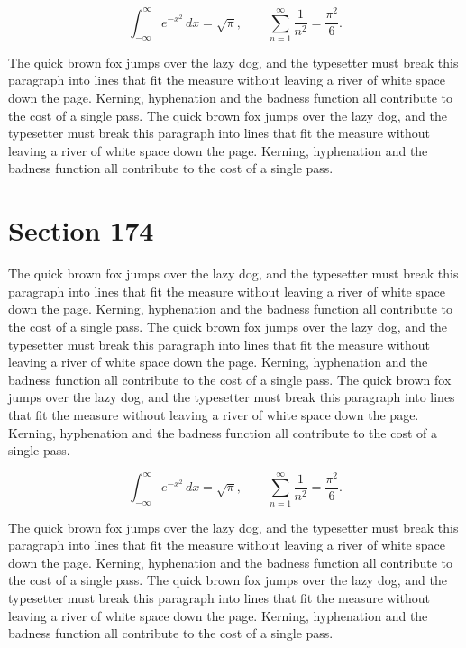 \documentclass{article}
\begin{document}
\begin{equation}
\int_{-\infty}^{\infty} e^{-x^{2}}\,dx = \sqrt{\pi}, \qquad
\sum_{n=1}^{\infty} \frac{1}{n^{2}} = \frac{\pi^{2}}{6}.
\end{equation}

The quick brown fox jumps over the lazy dog, and the typesetter must break this paragraph into lines that fit the measure without leaving a river of white space down the page. Kerning, hyphenation and the badness function all contribute to the cost of a single pass. The quick brown fox jumps over the lazy dog, and the typesetter must break this paragraph into lines that fit the measure without leaving a river of white space down the page. Kerning, hyphenation and the badness function all contribute to the cost of a single pass. 
\section{Section 174}
The quick brown fox jumps over the lazy dog, and the typesetter must break this paragraph into lines that fit the measure without leaving a river of white space down the page. Kerning, hyphenation and the badness function all contribute to the cost of a single pass. The quick brown fox jumps over the lazy dog, and the typesetter must break this paragraph into lines that fit the measure without leaving a river of white space down the page. Kerning, hyphenation and the badness function all contribute to the cost of a single pass. The quick brown fox jumps over the lazy dog, and the typesetter must break this paragraph into lines that fit the measure without leaving a river of white space down the page. Kerning, hyphenation and the badness function all contribute to the cost of a single pass. 

\begin{equation}
\int_{-\infty}^{\infty} e^{-x^{2}}\,dx = \sqrt{\pi}, \qquad
\sum_{n=1}^{\infty} \frac{1}{n^{2}} = \frac{\pi^{2}}{6}.
\end{equation}

The quick brown fox jumps over the lazy dog, and the typesetter must break this paragraph into lines that fit the measure without leaving a river of white space down the page. Kerning, hyphenation and the badness function all contribute to the cost of a single pass. The quick brown fox jumps over the lazy dog, and the typesetter must break this paragraph into lines that fit the measure without leaving a river of white space down the page. Kerning, hyphenation and the badness function all contribute to the cost of a single pass. 
\end{document}
